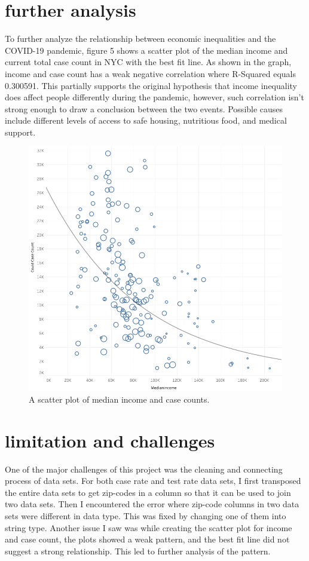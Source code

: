 \documentclass{vgtc}                 %
\begin{document}
\section{further analysis}{
To further analyze the relationship between economic inequalities and the COVID-19 pandemic, figure 5 shows a scatter plot of the median income and current total case count in NYC with the best fit line. As shown in the graph, income and case count has a weak negative correlation where R-Squared equals 0.300591. This partially supports the original hypothesis that income inequality does affect people differently during the pandemic, however, such correlation isn't strong enough to draw a conclusion between the two events. Possible causes include different levels of access to safe housing, nutritious food, and medical support. 
}

\begin{figure}[tb]
 \centering %
 \includegraphics[width=\columnwidth]{incomevscase.png}
 \caption{A scatter plot of median income and case counts.}
 \label{fig:sample}
\end{figure}

\section{limitation and challenges}{
One of the major challenges of this project was the cleaning and connecting process of data sets. For both case rate and test rate data sets, I first transposed the entire data sets to get zip-codes in a column so that it can be used to join two data sets. Then I encountered the error where zip-code columns in two data sets were different in data type. This was fixed by changing one of them into string type. Another issue I saw was while creating the scatter plot for income and case count, the plots showed a weak pattern, and the best fit line did not suggest a strong relationship. This led to further analysis of the pattern.  
}
\end{document}
